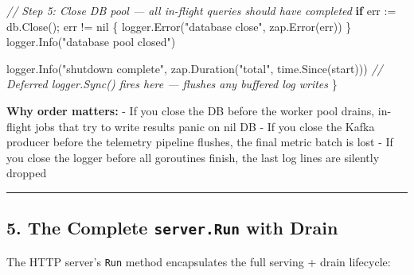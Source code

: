 \documentclass[
]{article}
\newenvironment{Shaded}{}{}
\newcommand{\CommentTok}[1]{\textcolor[rgb]{0.38,0.63,0.69}{\textit{#1}}}
\newcommand{\ControlFlowTok}[1]{\textcolor[rgb]{0.00,0.44,0.13}{\textbf{#1}}}
\newcommand{\NormalTok}[1]{#1}
\newcommand{\OperatorTok}[1]{\textcolor[rgb]{0.40,0.40,0.40}{#1}}
\newcommand{\OtherTok}[1]{\textcolor[rgb]{0.00,0.44,0.13}{#1}}
\newcommand{\StringTok}[1]{\textcolor[rgb]{0.25,0.44,0.63}{#1}}
\begin{document}
\begin{Shaded}
\begin{Highlighting}[]
    \CommentTok{// Step 5: Close DB pool — all in{-}flight queries should have completed}
    \ControlFlowTok{if}\NormalTok{ err }\OperatorTok{:=}\NormalTok{ db}\OperatorTok{.}\NormalTok{Close}\OperatorTok{();}\NormalTok{ err }\OperatorTok{!=} \OtherTok{nil} \OperatorTok{\{}
\NormalTok{        logger}\OperatorTok{.}\NormalTok{Error}\OperatorTok{(}\StringTok{"database close"}\OperatorTok{,}\NormalTok{ zap}\OperatorTok{.}\NormalTok{Error}\OperatorTok{(}\NormalTok{err}\OperatorTok{))}
    \OperatorTok{\}}
\NormalTok{    logger}\OperatorTok{.}\NormalTok{Info}\OperatorTok{(}\StringTok{"database pool closed"}\OperatorTok{)}

\NormalTok{    logger}\OperatorTok{.}\NormalTok{Info}\OperatorTok{(}\StringTok{"shutdown complete"}\OperatorTok{,}\NormalTok{ zap}\OperatorTok{.}\NormalTok{Duration}\OperatorTok{(}\StringTok{"total"}\OperatorTok{,}\NormalTok{ time}\OperatorTok{.}\NormalTok{Since}\OperatorTok{(}\NormalTok{start}\OperatorTok{)))}
    \CommentTok{// Deferred logger.Sync() fires here — flushes any buffered log writes}
\OperatorTok{\}}
\end{Highlighting}
\end{Shaded}

\textbf{Why order matters:} - If you close the DB before the worker pool
drains, in-flight jobs that try to write results panic on nil DB - If
you close the Kafka producer before the telemetry pipeline flushes, the
final metric batch is lost - If you close the logger before all
goroutines finish, the last log lines are silently dropped

\begin{center}\rule{0.5\linewidth}{0.5pt}\end{center}

\hypertarget{the-complete-server.run-with-drain}{%
\subsection{\texorpdfstring{5. The Complete \texttt{server.Run} with
Drain}{5. The Complete server.Run with Drain}}\label{the-complete-server.run-with-drain}}

The HTTP server's \texttt{Run} method encapsulates the full serving +
drain lifecycle:
\end{document}
